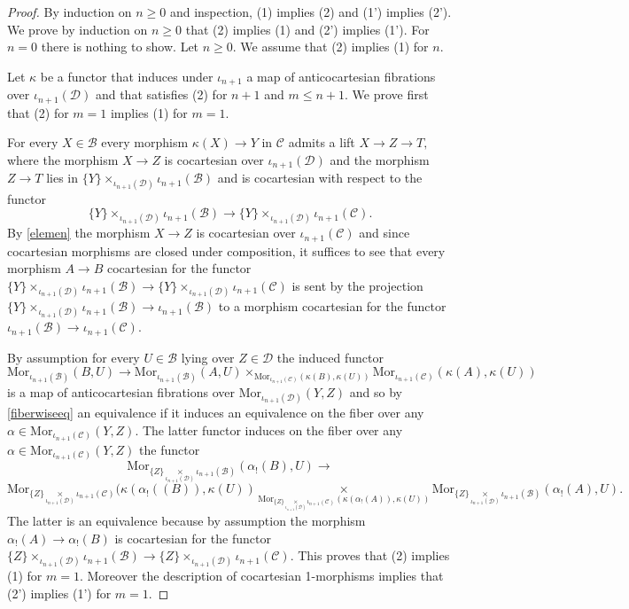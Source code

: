 \documentclass[10pt,oneside]{article}
\numberwithin{equation}{section} %
\numberwithin{figure}{section} %
\theoremstyle{plain}
\theoremstyle{definition}
\newcommand{\mB}{{\mathcal B}}
\newcommand{\mC}{{\mathcal C}}
\newcommand{\mD}{{\mathcal D}}
\newcommand{\Mor}{{\mathrm{Mor}}}
\begin{document}
\begin{proof}
By induction on $n\geq 0$ and inspection, (1) implies (2) and (1') implies (2').
We prove by induction on $n \geq 0$ that (2) implies (1) and (2') implies (1').
For $n=0$ there is nothing to show.
Let $n \geq 0.$ We assume that (2) implies (1) for $n.$

Let $\kappa$ be a functor that induces under $\iota_{n+1}$ a map of anticocartesian fibrations over $ \iota_{n+1}(\mD)$ and that satisfies (2) for $n+1$ and $m \leq n+1.$
We prove first that (2) for $m=1$ implies (1) for $m=1.$


For every $X \in \mB$ every morphism $\kappa(X) \to Y$ in $\mC$
admits a lift $ X \to Z \to T,$ where the morphism $X \to Z$ is cocartesian over $\iota_{n+1}(\mD)$ and the morphism $Z \to T$ lies in $\{Y\} \times_{\iota_{n+1}(\mD)} \iota_{n+1}(\mB)$
and is cocartesian with respect to the functor 
$$\{Y\} \times_{\iota_{n+1}(\mD)} \iota_{n+1}(\mB) \to \{Y\} \times_{\iota_{n+1}(\mD)} \iota_{n+1}(\mC).$$
By \cref{elemen} the morphism $X \to Z$ is cocartesian over $\iota_{n+1}(\mC)$ and since cocartesian morphisms are closed under composition,
it suffices to see that every morphism $A \to B$ 
cocartesian for the functor
$\{Y\} \times_{\iota_{n+1}(\mD)} \iota_{n+1}(\mB) \to \{Y\} \times_{\iota_{n+1}(\mD)} \iota_{n+1}(\mC)$
is sent by the projection $ \{Y\} \times_{\iota_{n+1}(\mD)} \iota_{n+1}(\mB)\to \iota_{n+1}(\mB)$ to a morphism cocartesian 
for the functor
$ \iota_{n+1}(\mB) \to \iota_{n+1}(\mC).$

By assumption for every $U \in \mB $ lying over $Z \in \mD$ the induced functor
$$ \Mor_{\iota_{n+1}(\mB)}(B,U) \to \Mor_{\iota_{n+1}(\mB)}(A,U) \times_{\Mor_{\iota_{n+1}(\mC)}(\kappa(B),\kappa(U))} \Mor_{\iota_{n+1}(\mC)}(\kappa(A),\kappa(U)) $$
is a map of anticocartesian fibrations over $\Mor_{\iota_{n+1}(\mD)}(Y,Z)$ and so by \cref{fiberwiseeq} an equivalence if
it induces an equivalence on the fiber over any $\alpha \in \Mor_{\iota_{n+1}(\mC)}(Y,Z).$
The latter functor induces on the fiber over any 
$\alpha \in \Mor_{\iota_{n+1}(\mC)}(Y,Z)$
the functor 
$$ \Mor_{\{Z \}\underset{\iota_{n+1}(\mD)}{\times}\iota_{n+1}(\mB)}(\alpha_!(B), U) \to $$$$ \Mor_{\{ Z \}\underset{\iota_{n+1}(\mD)}{\times}\iota_{n+1}(\mC)}(\kappa(\alpha_!((B)), \kappa(U)) \underset{\Mor_{\{ Z \}\underset{\iota_{n+1}(\mD)}{\times}\iota_{n+1}(\mC)}(\kappa(\alpha_!(A)), \kappa(U))}{\times} \Mor_{\{ Z \}\underset{\iota_{n+1}(\mD)}{\times}\iota_{n+1}(\mB)}(\alpha_!(A), U).$$
The latter is an equivalence because by assumption the morphism $ \alpha_!(A) \to \alpha_!(B) $ is cocartesian for the functor
$\{Z\} \times_{\iota_{n+1}(\mD)} \iota_{n+1}(\mB) \to \{Z\} \times_{\iota_{n+1}(\mD)} \iota_{n+1}(\mC)$.
This proves that (2) implies (1) for $m=1$.
Moreover the description of cocartesian 1-morphisms implies that (2') implies (1') for $m=1.$
    

\end{proof}
\end{document}
